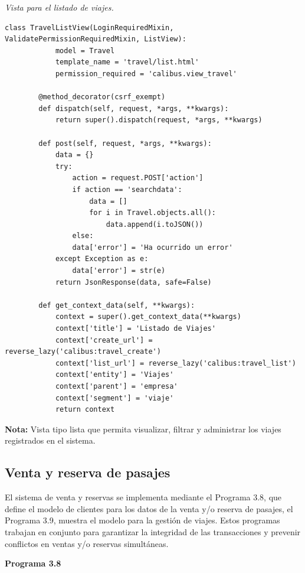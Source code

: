 	\textit{Vista para el listado de viajes.} %
	\vspace{0.3cm} %
	\begin{lstlisting}[lineskip=-1pt]
		class TravelListView(LoginRequiredMixin, ValidatePermissionRequiredMixin, ListView):
			model = Travel
			template_name = 'travel/list.html'
			permission_required = 'calibus.view_travel'
		
		@method_decorator(csrf_exempt)
		def dispatch(self, request, *args, **kwargs):
			return super().dispatch(request, *args, **kwargs)
		
		def post(self, request, *args, **kwargs):
			data = {}
			try:
				action = request.POST['action']
				if action == 'searchdata':
					data = []
					for i in Travel.objects.all():
						data.append(i.toJSON())
				else:
				data['error'] = 'Ha ocurrido un error'
			except Exception as e:
				data['error'] = str(e)
			return JsonResponse(data, safe=False)
		
		def get_context_data(self, **kwargs):
			context = super().get_context_data(**kwargs)
			context['title'] = 'Listado de Viajes'
			context['create_url'] = reverse_lazy('calibus:travel_create')
			context['list_url'] = reverse_lazy('calibus:travel_list')
			context['entity'] = 'Viajes'
			context['parent'] = 'empresa'
			context['segment'] = 'viaje'
			return context
	\end{lstlisting}
	
	\textbf{Nota:} Vista tipo lista que permita visualizar, filtrar y administrar los viajes registrados en el sistema.
	
	\subsection{Venta y reserva de pasajes}
		
		El sistema de venta y reservas se implementa mediante el Programa 3.8, que define el modelo de clientes para los datos de la venta y/o reserva de pasajes, el Programa 3.9, muestra el modelo para la gestión de viajes. Estos programas trabajan en conjunto para garantizar la integridad de las transacciones y prevenir conflictos en ventas y/o reservas simultáneas.
		
		\textbf{Programa 3.8}
		
